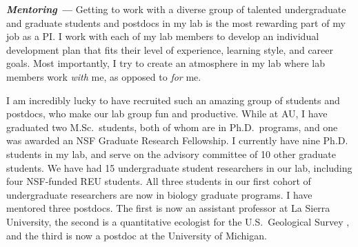 \textit{\textbf{Mentoring ---}}
Getting to work with a diverse group of talented undergraduate and graduate
students and postdocs in my lab is the most rewarding part of my job as a
PI.
I work with each of my lab members to develop an individual development
plan that fits
their level of experience, learning style, and career goals.
Most importantly, I try to create an atmosphere in my lab where
lab members work \emph{with} me, as opposed to \emph{for} me.

I am incredibly lucky to have recruited such an amazing group of students and
postdocs, who make
our lab group fun and productive.
While at AU, I have graduated two M.Sc.\ students, both of whom are in Ph.D.\
programs, and one was awarded an NSF Graduate Research Fellowship.
I currently have nine Ph.D. students in my lab, and serve on the advisory
committee of 10 other graduate students.
We have had 15 undergraduate student researchers in our lab, including four
NSF-funded REU students.
All three students in our first cohort of undergraduate researchers are now in
biology graduate programs.
I have mentored three postdocs.
The first is now an assistant professor at La Sierra University, the second is
a quantitative ecologist for the U.S.\ Geological Survey , and the third is
now a postdoc at the University of Michigan.
